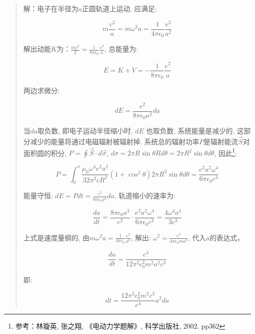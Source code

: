 \begin{quote}
    解：电子在半径为$a$正圆轨道上运动, 应满足:

\begin{equation*}
    m \frac{v^2}{a} = m \omega^2 a = \frac{1}{4 \pi \epsilon_0}
    \frac{e^2}{a^2}
\end{equation*}

解出动能$K$为：$\frac{mv^2}{2} = \frac{1}{8 \pi \epsilon_0}
\frac{e^2}{a}$, 总能量为:

\begin{equation*}
E = K + V = - \frac{1}{8 \pi \epsilon_0} \frac{e^2}{a}
\end{equation*}

两边求微分:

\begin{equation*}
d E = \frac{e^2}{8 \pi \epsilon_0 a^2} da
\end{equation*}


当$da$取负数, 即电子运动半径缩小时, $d E$ 也取负数,
系统能量是减少的, 这部分减少的能量将通过电磁辐射被辐射掉.
系统总的辐射功率$P$是辐射能流$\vec S$对面积圆的积分, $P = \oint \vec
S \cdot d \vec \sigma$, $d \sigma = 2 \pi R \sin \theta R d \theta =
2 \pi R^2 \sin \theta d \theta$, 因此\footnote{参考：林璇英, 张之翔,
《电动力学题解》, 科学出版社, 2002. pp362}:

\begin{equation*}
P = \int_0^{\pi} \frac{\mu_0 \omega^4 e^2 a^2}{32\pi^2 c R^2}
(1+\cos^2 \theta)2 \pi R^2 \sin \theta d \theta =
\frac{e^2a^2\omega^4}{6\pi \epsilon_0 c^3}
\end{equation*}

能量守恒: $dE = P dt  = \frac{e^2}{8 \pi \epsilon_0 a^2} da$,
轨道缩小的速率为:

\begin{equation*}
\frac{da}{dt} = \frac{8 \pi \epsilon_0 a^2}{e^2} \cdot
\frac{e^2a^2\omega^4}{6\pi \epsilon_0 c^3} = \frac{4 \omega^4 a^4
}{3 c^3}
\end{equation*}

上式是速度量纲的, 由$m \omega^2 a = \frac{1}{4 \pi \epsilon_0}
\frac{e^2}{a^2}$, 解出: $\omega^2 = \frac{e^2}{4 \pi \epsilon_0 m
a^3}$, 代入$\dot a$的表达式，

\begin{equation*}
\frac{da}{dt} = \frac{e^4}{12 \pi^2 \epsilon_0^2 m^2 a^2 c^3}
\end{equation*}

即:

\begin{equation*}
dt = \frac{12 \pi^2 \epsilon_0^2 m^2 c^3}{e^4} a^2 da
\end{equation*}


\end{quote}
